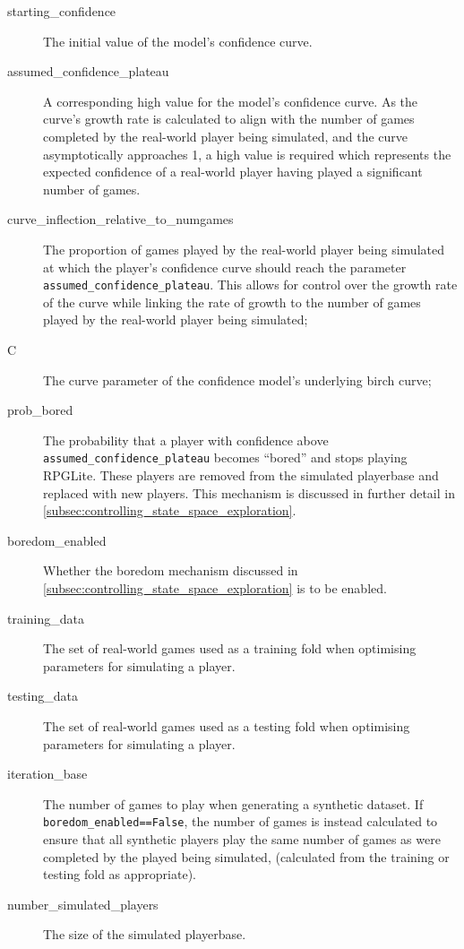 \begin{description}
  \item[starting\_confidence] The initial value of the model's confidence curve.
  \item[assumed\_confidence\_plateau] A corresponding high value for the model's
  confidence curve. As the curve's growth rate is calculated to align with the
  number of games completed by the real-world player being simulated, and the
  curve asymptotically approaches 1, a high value is required which represents
  the expected confidence of a real-world player having played a significant
  number of games.
  \item[curve\_inflection\_relative\_to\_numgames] The proportion of games played by
  the real-world player being simulated at which the player's confidence
  curve should reach the parameter \lstinline{assumed_confidence_plateau}. This
  allows for control over the growth rate of the curve while linking the rate of
  growth to the number of games played by the real-world player being simulated;
  \item[C] The curve parameter of the confidence model's underlying birch curve;
  \item[prob\_bored] The probability that a player with confidence above
  \lstinline{assumed_confidence_plateau} becomes ``bored'' and stops playing
  RPGLite. These players are removed from the simulated playerbase and replaced
  with new players. This mechanism is discussed in further detail in
  \cref{subsec:controlling_state_space_exploration}.
  \item[boredom\_enabled] Whether the boredom mechanism discussed in
  \cref{subsec:controlling_state_space_exploration} is to be enabled.
  \item[training\_data] The set of real-world games used as a training fold when
  optimising parameters for simulating a player.
  \item[testing\_data] The set of real-world games used as a testing fold when
  optimising parameters for simulating a player.
  \item[iteration\_base] The number of games to play when generating a synthetic
  dataset. If \lstinline{boredom_enabled==False}, the number of games is instead
  calculated to ensure that all synthetic players play the same number of games
  as were completed by the played being simulated, (calculated from the training
  or testing fold as appropriate).
  \item[number\_simulated\_players] The size of the simulated playerbase.

\end{description}
